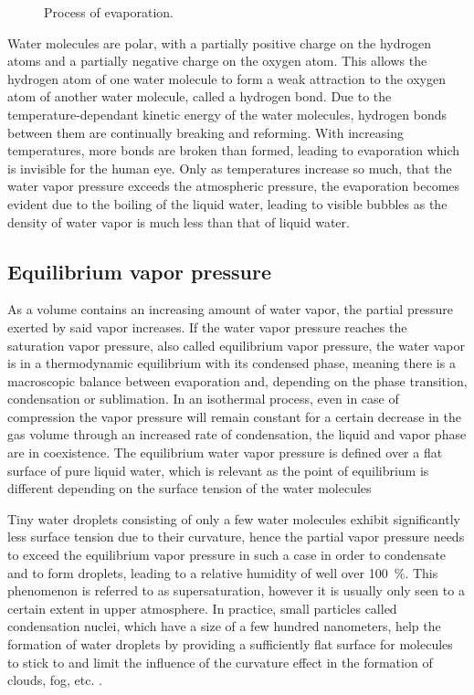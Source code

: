 \begin{figure}
    \centering
    \def\svgwidth{0.4\textwidth}
    
    \caption{Process of evaporation.}
\end{figure}

Water molecules are polar, with a partially positive charge on the hydrogen atoms and a partially negative charge on the oxygen atom. This allows the hydrogen atom of one water molecule to form a weak attraction to the oxygen atom of another water molecule, called a hydrogen bond. Due to the temperature-dependant kinetic energy of the water molecules, hydrogen bonds between them are continually breaking and reforming. With increasing temperatures, more bonds are broken than formed, leading to evaporation which is invisible for the human eye. Only as temperatures increase so much, that the water vapor pressure exceeds the atmospheric pressure, the evaporation becomes evident due to the boiling of the liquid water, leading to visible bubbles as the density of water vapor is much less than that of liquid water.

\subsection{Equilibrium vapor pressure}\label{c:equilibriumvaporpressure}
As a volume contains an increasing amount of water vapor, the partial pressure exerted by said vapor increases. If the water vapor pressure reaches the saturation vapor pressure, also called equilibrium vapor pressure, the water vapor is in a thermodynamic equilibrium with its condensed phase, meaning there is a macroscopic balance between evaporation and, depending on the phase transition, condensation or sublimation. In an isothermal process, even in case of compression the vapor pressure will remain constant for a certain decrease in the gas volume through an increased rate of condensation, the liquid and vapor phase are in coexistence.
The equilibrium water vapor pressure is defined over a flat surface of pure liquid water, which is relevant as the point of equilibrium is different depending on the surface tension of the water molecules \autocite{babinWaterVaporMyths,iribarneThermodynamicProcessesAtmosphere1981}

Tiny water droplets consisting of only a few water molecules exhibit significantly less surface tension due to their curvature, hence the partial vapor pressure needs to exceed the equilibrium vapor pressure in such a case in order to condensate and to form droplets, leading to a relative humidity of well over \qty{100}{\%}. This phenomenon is referred to as supersaturation, however it is usually only seen to a certain extent in upper atmosphere. In practice, small particles called condensation nuclei, which have a size of a few hundred nanometers, help the formation of water droplets by providing a sufficiently flat surface for molecules to stick to and limit the influence of the curvature effect in the formation of clouds, fog, etc. \autocite{iribarneThermodynamicProcessesAtmosphere1981}.

